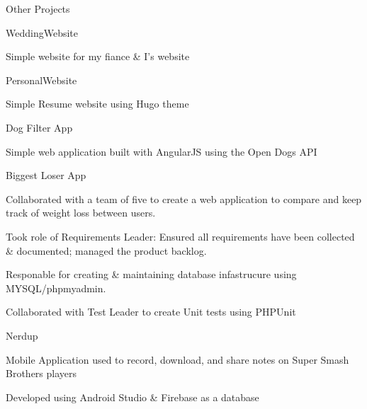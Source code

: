 \documentclass{resume} %
\begin{document}
    

\begin{rSection}{Other Projects}
    \begin{rSubsection}{WeddingWebsite}{}{}{}
        \item Simple website for my fiance \& I's website
    \end{rSubsection}

    \begin{rSubsection}{PersonalWebsite}{}{}{}
        \item Simple Resume website using Hugo theme
    \end{rSubsection}

    \begin{rSubsection}{Dog Filter App}{}{}{}
        \item Simple web application built with AngularJS using the Open Dogs API
    \end{rSubsection}

    \begin{rSubsection}{Biggest Loser App}{}{}{}
        \item Collaborated with a team of five to create a web application to compare and keep track of weight loss between users.
        \item Took role of Requirements Leader:  Ensured all requirements have been collected \& documented; managed the product backlog.
        \item Responable for creating \& maintaining database infastrucure using MYSQL/phpmyadmin.
        \item Collaborated with Test Leader to create Unit tests using PHPUnit
    \end{rSubsection}

    \begin{rSubsection}{Nerdup}{}{}{}
        \item Mobile Application used to record, download, and share notes on Super Smash Brothers players
        \item Developed using Android Studio \& Firebase as a database
    \end{rSubsection}


\end{rSection}
\end{document}
